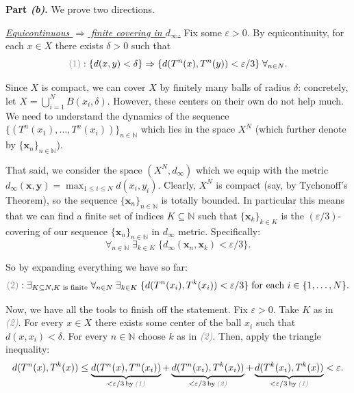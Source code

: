 \documentclass{template}
\begin{document}
\textcolor{blue!70!black}{\textbf{Part \textit{(b)}.}} We prove two directions.

\underline{\textit{Equicontinuous $\Rightarrow$ finite covering in $d_{\infty}$.}} Fix some
$\varepsilon > 0$. By equicontinuity, for each $x \in X$ there exists $\delta>0$
such that
\begin{equation*}
    \textcolor{gray}{(1)}: \{d(x,y) < \delta\} \Rightarrow \{d(T^n(x), T^n(y)) < \varepsilon/3\} \; \forall_{n \in \mathbb{N}}.
\end{equation*}

Since $X$ is compact, we can cover $X$ by finitely many balls of radius
$\delta$: concretely, let $X = \bigcup_{i=1}^N B(x_i,\delta)$. However, these
centers on their own do not help much. We need to understand the dynamics of the
sequence $\{(T^n(x_1),\dots,T^n(x_i))\}_{n \in \mathbb{N}}$ which lies in the
space $X^N$ (which further denote by $\{\mathbf{x}_n\}_{n \in \mathbb{N}}$).

That said, we consider the space $(X^N,d_{\infty})$ which we equip with the
metric $d_{\infty}(\mathbf{x},\mathbf{y})=\max_{1 \leq i \leq N}d(x_i,y_i)$.
Clearly, $X^N$ is compact (say, by Tychonoff's Theorem), so the sequence
$\{\mathbf{x}_n\}_{n \in \mathbb{N}}$ is totally bounded. In particular this 
means that we can find a finite set of indices $K \subseteq \mathbb{N}$
such that $\{\mathbf{x}_k\}_{k \in K}$ is the $(\varepsilon/3)$-covering 
of our sequence $\{\mathbf{x}_n\}_{n \in \mathbb{N}}$ in $d_{\infty}$ metric. Specifically:
\begin{equation*}
    \forall_{n \in \mathbb{N}} \; \exists_{k \in K} \; \{d_{\infty}(\mathbf{x}_n, \mathbf{x}_k) < \varepsilon/3\}.
\end{equation*}

So by expanding everything we have so far:
\begin{equation*}
    \textcolor{gray}{(2)}: \exists_{K \subseteq \mathbb{N}, K \text{ is finite}} \; \forall_{n \in \mathbb{N}} \; \exists_{k \in K} \; \{d(T^n(x_i), T^k(x_i)) < \varepsilon/3\} \; \text{for each $i \in \{1,\dots,N\}$}.
\end{equation*}

Now, we have all the tools to finish off the statement. Fix $\varepsilon>0$.
Take $K$ as in \textcolor{gray}{\textit{(2)}}. For every $x \in X$ there exists
some center of the ball $x_i$ such that $d(x,x_i)<\delta$. For every $n \in
\mathbb{N}$ choose $k$ as in \textcolor{gray}{\textit{(2)}}. Then, apply the
triangle inequality:
\begin{equation*}
    d(T^n(x), T^k(x)) \leq 
    \underbrace{d(T^n(x),T^n(x_i))}_{< \varepsilon/3 \, \text{by} \, \textcolor{gray}{\textit{(1)}}} 
    + \underbrace{d(T^n(x_i), T^k(x_i))}_{< \varepsilon/3 \, \text{by} \, \textcolor{gray}{\textit{(2)}}} 
    + \underbrace{d(T^k(x_i), T^k(x))}_{< \varepsilon/3 \, \text{by} \, \textcolor{gray}{\textit{(1)}}}
    < \varepsilon.
\end{equation*}
\end{document}
